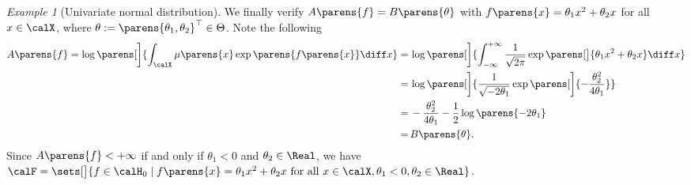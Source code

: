 \documentclass[12pt]{article}
\theoremstyle{definition}
\theoremstyle{theorem}
\theoremstyle{remark}
\newtheorem{example}{Example}
\begin{document}
\begin{example}[Univariate normal distribution]
	We finally verify $A \parens{f} = B \parens{\theta}$ with $f \parens{x} = \theta_1 x^2 + \theta_2 x$ for all $x \in \calX$, where $\theta := \parens{\theta_1, \theta_2}^\top \in \Theta$. Note the following 
	\begin{align*}
		A \parens{f} = \log \parens[\bigg]{\int_{\calX} \mu \parens{x} \exp \parens{f \parens{x}}\diff x} 
		= & \, \log \parens[\bigg]{\int_{-\infty}^{+\infty} \frac{1}{\sqrt{2 \pi}} \exp \parens[\big]{\theta_1 x^2 + \theta_2 x} \diff x} \\ 
		= & \, \log \parens[\bigg]{ \frac{1}{\sqrt{-2\theta_1}} \exp \parens[\bigg]{ - \frac{\theta_2^2}{4\theta_1}} } \\ 
		= & \, - \frac{\theta_2^2}{4\theta_1} - \frac{1}{2} \log\parens{-2\theta_1} \\ 
		= & \, B \parens{\theta}. 
	\end{align*}
	Since $A \parens{f} < + \infty$ if and only if $\theta_1 < 0$ and $\theta_2 \in \Real$, we have $\calF = \sets[\big]{f \in \calH_0 \mid f \parens{x} = \theta_1 x^2 + \theta_2 x \text{ for all } x \in \calX, \theta_1 < 0, \theta_2 \in \Real}$. 
\end{example}

\end{document}
